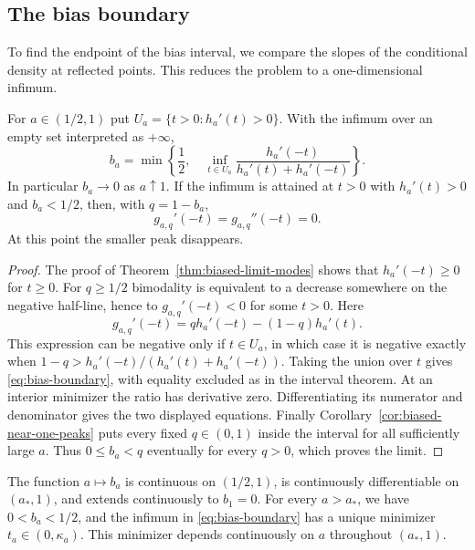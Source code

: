 \subsection{The bias boundary}

To find the endpoint of the bias interval, we compare the slopes
of the conditional density at reflected points. This reduces the
problem to a one-dimensional infimum.

\begin{proposition}
\label{prop:bias-boundary}
For $a\in(1/2,1)$ put $U_a=\{t>0:h_a'(t)>0\}$. With the infimum
over an empty set interpreted as $+\infty$,
\begin{equation}\label{eq:bias-boundary}
 b_a=\min\left\{\frac12,\quad
       \inf_{t\in U_a}\frac{h_a'(-t)}{h_a'(t)+h_a'(-t)}\right\}.
\end{equation}
In particular $b_a\to0$ as $a\uparrow1$. If the infimum is attained
at $t>0$ with $h_a'(t)>0$ and $b_a<1/2$, then, with $q=1-b_a$,
\[
 g_{a,q}'(-t)=g_{a,q}''(-t)=0.
\]
At this point the smaller peak disappears.
\end{proposition}

\begin{proof}
The proof of Theorem~\ref{thm:biased-limit-modes} shows that
$h_a'(-t)\ge0$ for $t\ge0$. For $q\ge1/2$ bimodality is equivalent
to a decrease somewhere on the negative half-line, hence to
$g_{a,q}'(-t)<0$ for some $t>0$. Here
\[
 g_{a,q}'(-t)=q h_a'(-t)-(1-q)h_a'(t).
\]
This expression can be negative only if $t\in U_a$, in which case
it is negative exactly when
$1-q>h_a'(-t)/(h_a'(t)+h_a'(-t))$. Taking the union over $t$ gives
\eqref{eq:bias-boundary}, with equality excluded as in the interval
theorem. At an interior minimizer the ratio has derivative zero.
Differentiating its numerator and denominator gives the two displayed
equations. Finally Corollary~\ref{cor:biased-near-one-peaks} puts every
fixed $q\in(0,1)$ inside the interval for all sufficiently large $a$.
Thus $0\le b_a<q$ eventually for every $q>0$, which proves the limit.
\end{proof}

\begin{theorem}\label{thm:bias-continuity}
The function $a\mapsto b_a$ is continuous on $(1/2,1)$, is continuously
differentiable on $(a_*,1)$, and extends
continuously to $b_1=0$. For every $a>a_*$, we have $0<b_a<1/2$,
and the infimum in
\eqref{eq:bias-boundary} has a unique minimizer $t_a\in(0,\kappa_a)$.
This minimizer depends continuously on $a$ throughout $(a_*,1)$.
\end{theorem}

